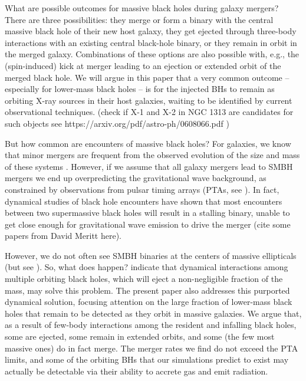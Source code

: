 \documentclass[fleqn,usenatbib,useAMS]{mnras}
\begin{document}
What are possible outcomes for massive black holes during galaxy mergers?  There are three possibilities: they merge or form a binary with the central massive black hole of their new host galaxy, they get ejected through three-body interactions with an existing central black-hole binary, or they remain in orbit in the merged galaxy.  Combinations of these options are also possible with, e.g., the (spin-induced) kick at merger leading to an ejection or extended orbit of the merged black hole. We will argue in this paper that a very common outcome -- especially for lower-mass black holes -- is for the injected BHs to remain as orbiting X-ray sources in their host galaxies, waiting to be identified by current observational techniques. (check if X-1 and X-2 in NGC 1313 are candidates for such objects see https://arxiv.org/pdf/astro-ph/0608066.pdf )

But how common are encounters of massive black holes?  For galaxies, we know that minor mergers are frequent from the observed evolution of the size and mass of these systems \citep{2010ApJ...718L..73V, 2008ApJ...677L...5V, 2019MNRAS.484..595M}. However, if we assume that all galaxy mergers lead to SMBH mergers we end up overpredicting the  gravitational wave background, as constrained by observations from pulsar timing arrays (PTAs, see \citealt{2008MNRAS.390..192S, 2009MNRAS.394.2255S, 2013MNRAS.433L...1S, 2014ApJ...789..156M, 2015ApJ...799..178K, 2016APS..APRR18003T, 2018ApJ...856...42S, 2018MNRAS.479.4017I, 2018ApJ...863L..36I, 2018NatCo...9..573M}). In fact, dynamical studies of black hole encounters have shown that most encounters between two supermassive black holes will result in a stalling binary, unable to get close enough for gravitational wave emission to drive the merger (cite some papers from David Meritt here).

However, we do not often see SMBH binaries at the centers of massive ellipticals (but see \citealt{2016MNRAS.463.2145C}).  So, what does happen?  \cite{2018MNRAS.473.3410R} indicate that dynamical interactions among multiple orbiting black holes, which will eject a non-negligible fraction of the mass, may solve this problem.  The present paper also addresses this purported dynamical solution, focusing attention on the large fraction of lower-mass black holes that remain to be detected as they orbit in massive galaxies.  We argue that, as a result of few-body interactions among the resident and infalling black holes, some are ejected, some remain in extended orbits, and some (the few most massive ones) do in fact merge. The merger rates we find do not exceed the PTA limits, and some of the orbiting BHs that our simulations predict to exist may actually be detectable via their ability to accrete gas and emit radiation.
\end{document}
